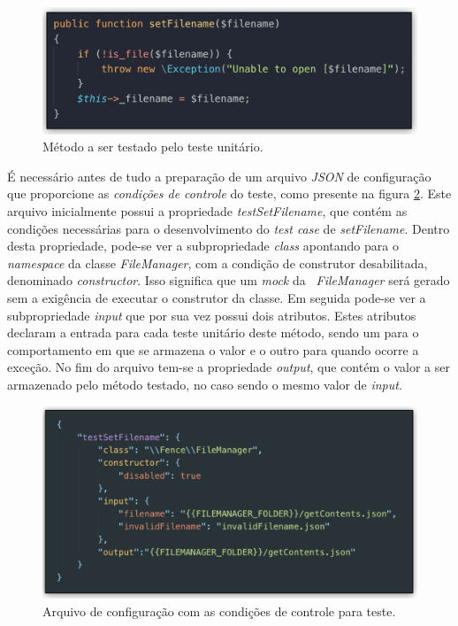 \begin{figure}[H]
    \centering
    \includegraphics[width=13cm]{source/4-solucao/images/metodo-testado.png}
    \caption{Método a ser testado pelo teste unitário.}
    \label{fig:metodo-testado}
\end{figure}

É necessário antes de tudo a preparação de um arquivo \emph{JSON} de configuração que proporcione as \emph{condições de controle} do teste, como presente na figura \ref{fig:condicoes-de-controle}. Este arquivo inicialmente possui a propriedade \emph{testSetFilename}, que contém as condições necessárias para o desenvolvimento do \emph{test case} de \emph{setFilename}. Dentro desta propriedade, pode-se ver a subpropriedade \emph{class} apontando para o \emph{namespace} da classe \emph{FileManager}, com a condição de construtor desabilitada, denominado \emph{constructor}. Isso significa que um \emph{mock} da \emph{~FileManager} será gerado sem a exigência de executar o construtor da classe. Em seguida pode-se ver a subpropriedade \emph{input} que por sua vez possui dois atributos. Estes atributos declaram a entrada para cada teste unitário deste método, sendo um para o comportamento em que se armazena o valor e o outro para quando ocorre a exceção. No fim do arquivo tem-se a propriedade \emph{output}, que contém o valor a ser armazenado pelo método testado, no caso sendo o mesmo valor de \emph{input}.

\begin{figure}[H]
    \centering
    \includegraphics[width=13cm]{source/4-solucao/images/condicoes-de-controle.png}
    \caption{Arquivo de configuração com as condições de controle para teste.}
    \label{fig:condicoes-de-controle}
\end{figure}

